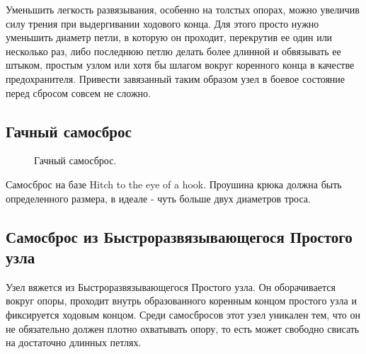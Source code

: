 Уменьшить легкость развязывания, особенно на толстых опорах, можно увеличив силу трения при выдергивании ходового конца. Для этого просто нужно уменьшить диаметр петли, в которую он проходит, перекрутив ее один или несколько раз, либо последнюю петлю делать более длинной и обвязывать ее штыком, простым узлом или хотя бы шлагом вокруг коренного конца в качестве предохранителя. Привести завязанный таким образом узел в боевое состояние перед сбросом совсем не сложно.

\subsection{Гачный самосброс}

\begin{figure}[H]\centering
	\begin{minipage}{1\linewidth}
		\begin{center}
			\tcbox[enhanced jigsaw,colframe=black,opacityframe=0.5,opacityback=0.5]
			{\centering{}}
		\end{center}
	\end{minipage}
\caption{Гачный самосброс.}
\label{ris:Gachny_samosbros}
\end{figure}

Самосброс на базе Hitch to the eye of a hook. Проушина крюка должна быть определенного размера, в идеале - чуть больше двух диаметров троса.

\subsection{Самосброс из Быстроразвязывающегося Простого узла}

Узел вяжется из Быстроразвязывающегося Простого узла. Он оборачивается вокруг опоры, проходит внутрь образованного коренным концом простого узла и фиксируется ходовым концом. Среди самосбросов этот узел уникален тем, что он не обязательно должен плотно охватывать опору, то есть может свободно свисать на достаточно длинных петлях.

\begin{figure}[H]\centering
	\subfloat[Завязывание]{\label{ris:Arbor_samosbros_1_1}
	\tcbox[enhanced jigsaw,colframe=black,opacityframe=0.5,opacityback=0.5,height=6cm]
		{\centering
			}
		}
\hfil
	\subfloat[Результат]{\label{ris:Arbor_samosbros_1_2}
	\tcbox[enhanced jigsaw,colframe=black,opacityframe=0.5,opacityback=0.5,height=6cm]
		{\centering
			}
		}
\end{figure}

